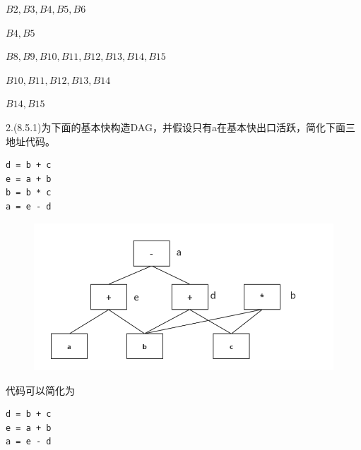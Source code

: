 \documentclass[a4paper, 16pt]{article}
\begin{document}
$B2,B3,B4,B5,B6$

$B4,B5$

$B8,B9,B10,B11,B12,B13,B14,B15$

$B10,B11,B12,B13,B14$

$B14,B15$

2.(8.5.1)为下面的基本快构造DAG，并假设只有a在基本快出口活跃，简化下面三地址代码。
\lstset{language=C}
\begin{lstlisting}
d = b + c
e = a + b
b = b * c
a = e - d
\end{lstlisting}
\begin{figure}[H]
\centering
\includegraphics[scale=0.5]{chapter8_hw2_2}
\end{figure}
代码可以简化为

\lstset{language=C}
\begin{lstlisting}
d = b + c
e = a + b
a = e - d
\end{lstlisting}
\end{document}
